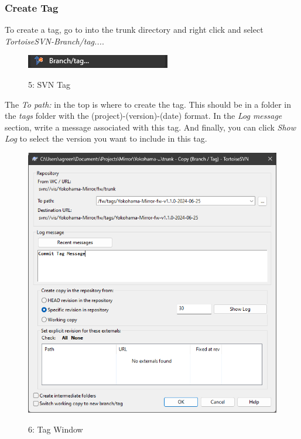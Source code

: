 \documentclass[10pt]{article}
\begin{document}
            \subsubsection{Create Tag}
                To create a tag, go to into the trunk directory and right click and select \emph{TortoiseSVN-Branch/tag...}.
                \begin{figure}[H]
                    \centerline{\includegraphics{References/Tag.png}}
                    \figurename{ 5: SVN Tag}
                \end{figure}
                The \emph{To path:} in the top is where to create the tag. This should be in a folder in the \emph{tags} folder with the (project)-(version)-(date) format. In the \emph{Log message} section, write a message associated with this tag. And finally, you can click \emph{Show Log} to select the version you want to include in this tag.
                \begin{figure}[H]
                    \centerline{\includegraphics[width=\textwidth]{References/Tag Window.png}}
                    \figurename{ 6: Tag Window}
                \end{figure}
\end{document}
